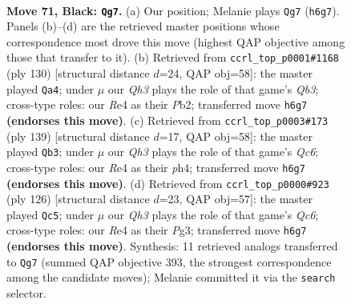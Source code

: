 \documentclass[11pt]{article}
\begin{document}
\clearpage

\begin{figure}[p]\centering
\begin{subfigure}{0.46\textwidth}\centering
\resizebox{\linewidth}{!}{%
\newchessgame
\chessboard[
  setfen={8/3Q3k/5p1q/3p4/4r3/6P1/6KP/8 b - - 23 71},
  showmover=false,
  pgfstyle=straightmove, color=movearrow, markmove={h6-g7}
]}
\caption{}
\end{subfigure}\hfill
\begin{subfigure}{0.46\textwidth}\centering
\resizebox{\linewidth}{!}{%
\newchessgame
\chessboard[
  setfen={8/P4pk1/q6p/2p5/6p1/KQ6/1P6/8 w - - 4 66},
  showmover=false,
  pgfstyle=straightmove, color=movearrow, markmove={b3-a4}
]}
\caption{}
\end{subfigure}
\\[4pt]
\begin{subfigure}{0.46\textwidth}\centering
\resizebox{\linewidth}{!}{%
\newchessgame
\chessboard[
  setfen={8/8/8/1Q5p/7P/p1q3P1/1k3PK1/8 b - - 17 70},
  showmover=false,
  pgfstyle=straightmove, color=movearrow, markmove={c3-b3}
]}
\caption{}
\end{subfigure}\hfill
\begin{subfigure}{0.46\textwidth}\centering
\resizebox{\linewidth}{!}{%
\newchessgame
\chessboard[
  setfen={7k/6p1/1KQ4p/P7/8/4q1P1/7P/8 w - - 15 64},
  showmover=false,
  pgfstyle=straightmove, color=movearrow, markmove={c6-c5}
]}
\caption{}
\end{subfigure}
\caption{\textbf{Move 71, Black: \texttt{Qg7}.} (a) Our position; Melanie plays \texttt{Qg7} (\texttt{h6g7}). Panels (b)--(d) are the retrieved master positions whose correspondence most drove this move (highest QAP objective among those that transfer to it). (b) Retrieved from \texttt{ccrl\_top\_p0001\#1168} (ply 130) [structural distance $d$=24, QAP obj=58]: the master played \texttt{Qa4}; under $\mu$ our \emph{Qh3} plays the role of that game's \emph{Qb3}; cross-type roles: our \emph{R}e4 as their \emph{P}b2; transferred move \texttt{h6g7} \textbf{(endorses this move)}. (c) Retrieved from \texttt{ccrl\_top\_p0003\#173} (ply 139) [structural distance $d$=17, QAP obj=58]: the master played \texttt{Qb3}; under $\mu$ our \emph{Qh3} plays the role of that game's \emph{Qc6}; cross-type roles: our \emph{R}e4 as their \emph{p}h4; transferred move \texttt{h6g7} \textbf{(endorses this move)}. (d) Retrieved from \texttt{ccrl\_top\_p0000\#923} (ply 126) [structural distance $d$=23, QAP obj=57]: the master played \texttt{Qc5}; under $\mu$ our \emph{Qh3} plays the role of that game's \emph{Qc6}; cross-type roles: our \emph{R}e4 as their \emph{P}g3; transferred move \texttt{h6g7} \textbf{(endorses this move)}. Synthesis: 11 retrieved analogs transferred to \texttt{Qg7} (summed QAP objective 393, the strongest correspondence among the candidate moves); Melanie committed it via the \texttt{search} selector.}
\label{fig:thought-m141}
\end{figure}
\end{document}
